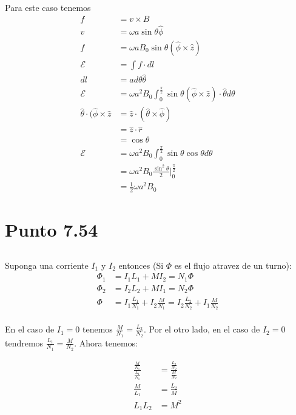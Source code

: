\documentclass{report}
\begin{document}
Para este caso tenemos
\begin{align*}
	f &= v \times B\\
	v &= \omega a\sin\theta\hat{\phi}\\
	f &= \omega a B_0 \sin\theta (\hat{\phi}\times \hat{z})\\
	\mathcal{E} &= \int f \cdot dl\\
	dl &= a d\theta \hat{\theta}\\
	\mathcal{E} &= \omega a^2 B_0 \int_0^{\frac{\pi}{2}} \sin\theta (\hat{\phi} \times \hat{z})\cdot \hat{\theta}d\theta\\
	\hat{\theta}\cdot(\hat{\phi}\times \hat{z} &= \hat{z}\cdot(\hat{\theta}\times \hat{\phi})\\
	&= \hat{z} \cdot \hat{r}\\
	&= \cos \theta\\
	\mathcal{E} &= \omega a^2 B_0 \int_{0}^{\frac{\pi}{2}}\sin\theta \cos\theta d\theta\\
	&= \omega a^2 B_0 \frac{\sin^2\theta}{2}|_0^{\frac{\pi}{2}}\\
	&= \frac{1}{2}\omega a^2 B_0
\end{align*}

\chapter{Punto 7.54}

\section{}

Suponga una corriente $I_1$ y $I_2$ entonces (Si $\Phi$ es el flujo atravez de un turno):
\begin{align*}
	\Phi_1 &= I_1L_1 + MI_2 = N_1 \Phi\\
	\Phi_2 &= I_2L_2 + MI_1 = N_2 \Phi\\
	\Phi &= I_1 \frac{L_1}{N_1} + I_2\frac{M}{N_1} = I_2\frac{L_2}{N_2} + I_1 \frac{M}{N_2}\\
\end{align*}

En el caso de $I_1 = 0$ tenemos $\frac{M}{N_1} = \frac{L_2}{N_2}$. Por el otro lado, en el caso de $I_2 = 0$ tendremos $\frac{L_1}{N_1} = \frac{M}{N_2}$. Ahora tenemos:

\begin{align*}
	\frac{\frac{M}{N_1}}{\frac{L_1}{N_1}} &= \frac{\frac{L_2}{N_2}}{\frac{M}{N_2}}\\
	\frac{M}{L_1} &= \frac{L_2}{M}\\
	L_1L_2 &= M^2
\end{align*}
\end{document}
